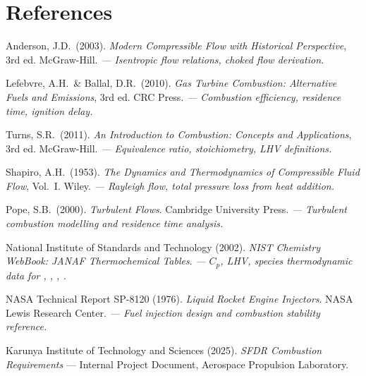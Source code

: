 \documentclass[12pt,a4paper]{report}
\begin{document}
\chapter*{References}

\begin{enumerate}[label={[\arabic*]}, leftmargin=2.2em, itemsep=6pt]
  \item Anderson, J.D.\ (2003).
        \textit{Modern Compressible Flow with Historical Perspective}, 3rd ed.
        McGraw-Hill.
        \textit{— Isentropic flow relations, choked flow derivation.}

  \item Lefebvre, A.H.\ \& Ballal, D.R.\ (2010).
        \textit{Gas Turbine Combustion: Alternative Fuels and Emissions}, 3rd ed.
        CRC Press.
        \textit{— Combustion efficiency, residence time, ignition delay.}

  \item Turns, S.R.\ (2011).
        \textit{An Introduction to Combustion: Concepts and Applications}, 3rd ed.
        McGraw-Hill.
        \textit{— Equivalence ratio, stoichiometry, LHV definitions.}

  \item Shapiro, A.H.\ (1953).
        \textit{The Dynamics and Thermodynamics of Compressible Fluid Flow},
        Vol.\ I. Wiley.
        \textit{— Rayleigh flow, total pressure loss from heat addition.}

  \item Pope, S.B.\ (2000).
        \textit{Turbulent Flows}.
        Cambridge University Press.
        \textit{— Turbulent combustion modelling and residence time analysis.}

  \item National Institute of Standards and Technology (2002).
        \textit{NIST Chemistry WebBook: JANAF Thermochemical Tables}.
        \textit{— $C_p$, LHV, species thermodynamic data for ,
          , , .}

  \item NASA Technical Report SP-8120 (1976).
        \textit{Liquid Rocket Engine Injectors}.
        NASA Lewis Research Center.
        \textit{— Fuel injection design and combustion stability reference.}

  \item Karunya Institute of Technology and Sciences (2025).
        \textit{SFDR Combustion Requirements} — Internal Project Document,
        Aerospace Propulsion Laboratory.
\end{enumerate}
\end{document}
